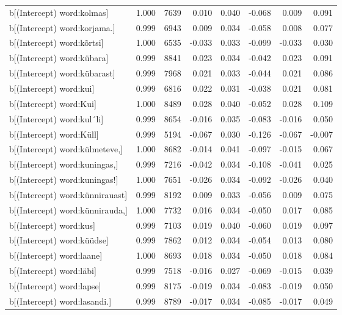\begin{longtable}{lrrrrrrr}
  b[(Intercept) word:kolmas] & 1.000 & 7639 & 0.010 & 0.040 & -0.068 & 0.009 & 0.091 \\ 
  b[(Intercept) word:korjama.] & 0.999 & 6943 & 0.009 & 0.034 & -0.058 & 0.008 & 0.077 \\ 
  b[(Intercept) word:kõrtsi] & 1.000 & 6535 & -0.033 & 0.033 & -0.099 & -0.033 & 0.030 \\ 
  b[(Intercept) word:kübara] & 0.999 & 8841 & 0.023 & 0.034 & -0.042 & 0.023 & 0.091 \\ 
  b[(Intercept) word:kübarast] & 0.999 & 7968 & 0.021 & 0.033 & -0.044 & 0.021 & 0.086 \\ 
  b[(Intercept) word:kui] & 0.999 & 6816 & 0.022 & 0.031 & -0.038 & 0.021 & 0.081 \\ 
  b[(Intercept) word:Kui] & 1.000 & 8489 & 0.028 & 0.040 & -0.052 & 0.028 & 0.109 \\ 
  b[(Intercept) word:kul´li] & 0.999 & 8654 & -0.016 & 0.035 & -0.083 & -0.016 & 0.050 \\ 
  b[(Intercept) word:Küll] & 0.999 & 5194 & -0.067 & 0.030 & -0.126 & -0.067 & -0.007 \\ 
  b[(Intercept) word:külmeteve,] & 1.000 & 8682 & -0.014 & 0.041 & -0.097 & -0.015 & 0.067 \\ 
  b[(Intercept) word:kuningas,] & 0.999 & 7216 & -0.042 & 0.034 & -0.108 & -0.041 & 0.025 \\ 
  b[(Intercept) word:kuningas!] & 1.000 & 7651 & -0.026 & 0.034 & -0.092 & -0.026 & 0.040 \\ 
  b[(Intercept) word:künnirauast] & 0.999 & 8192 & 0.009 & 0.033 & -0.056 & 0.009 & 0.075 \\ 
  b[(Intercept) word:künnirauda,] & 1.000 & 7732 & 0.016 & 0.034 & -0.050 & 0.017 & 0.085 \\ 
  b[(Intercept) word:kus] & 0.999 & 7103 & 0.019 & 0.040 & -0.060 & 0.019 & 0.097 \\ 
  b[(Intercept) word:küüdse] & 0.999 & 7862 & 0.012 & 0.034 & -0.054 & 0.013 & 0.080 \\ 
  b[(Intercept) word:laane] & 1.000 & 8693 & 0.018 & 0.034 & -0.050 & 0.018 & 0.084 \\ 
  b[(Intercept) word:läbi] & 0.999 & 7518 & -0.016 & 0.027 & -0.069 & -0.015 & 0.039 \\ 
  b[(Intercept) word:lapse] & 0.999 & 8175 & -0.019 & 0.034 & -0.083 & -0.019 & 0.050 \\ 
  b[(Intercept) word:lasandi.] & 0.999 & 8789 & -0.017 & 0.034 & -0.085 & -0.017 & 0.049 \\ 

\end{longtable}
